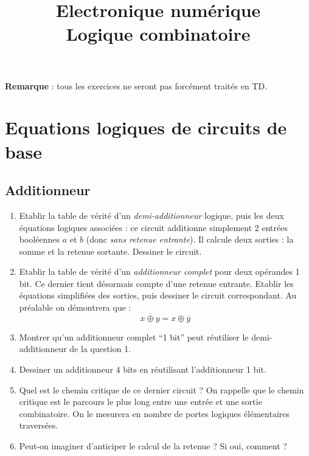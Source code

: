 \documentclass[a4paper,11pt]{article}
\title{{\Huge Electronique numérique}\\Logique combinatoire}
\date{}
\begin{document}
\maketitle

{\bf Remarque} : tous les exercices ne seront pas forcément traités en TD.

\section{Equations logiques de circuits de base}

\subsection{Additionneur}
\begin{enumerate}
\item Etablir la table de vérité d'un {\it demi-additionneur} logique, puis les deux équations logiques associées : ce circuit additionne simplement 2 entrées booléennes $a$ et $b$ (donc {\it sans retenue entrante}). Il calcule deux sorties : la somme et la retenue sortante. Dessiner le circuit.
\item Etablir la table de vérité d'un {\it additionneur complet} pour deux opérandes 1 bit. Ce dernier tient désormais compte d'une retenue entrante. Etablir les équations simplifiées des sorties, puis dessiner le circuit correspondant. Au préalable on démontrera que :
$$\overline{x\oplus y}=x \oplus \overline{y}$$
\item Montrer qu'un additionneur complet ``1 bit'' peut réutiliser le demi-additionneur de la question 1.
\item Dessiner un additionneur 4 bits en réutilisant l'additionneur 1 bit.
\item Quel est le chemin critique de ce dernier circuit ? On rappelle que le chemin critique est le parcours le plus long entre une entrée et une sortie combinatoire. On le mesurera en nombre de portes logiques élémentaires traversées.
\item Peut-on imaginer d'anticiper le calcul de la retenue ? Si oui, comment ?
\end{enumerate}
\end{document}
